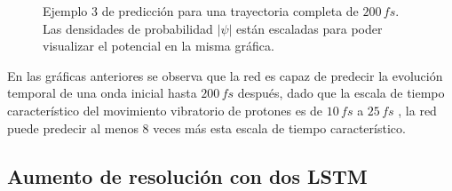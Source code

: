 \begin{figure}[H]
  \centering
  \caption{Ejemplo 3 de predicción para una trayectoria completa de $200\,fs$.\\ Las densidades de probabilidad $|\psi|$ están escaladas para poder visualizar el potencial en la misma gráfica.}
  \label{fig:trajec3}
\end{figure}

En las gráficas anteriores se observa que la red es capaz de predecir la evolución temporal de una onda inicial hasta $200\,fs$ después, dado que la escala de tiempo característico del movimiento vibratorio de protones es de $10\,fs$ a $25\,fs$ \cite{Main:2021}, la red puede predecir al menos 8 veces más esta escala de tiempo característico.  


\subsection{Aumento de resolución con dos LSTM}

